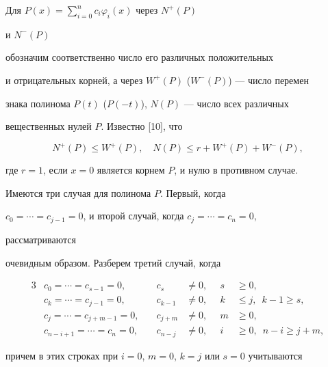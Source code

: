 \begin{pf} Для $P(x)=\sum\limits^n_{i=0}c_i\varphi_i(x)$ через $N^+(P)$ 


и $N^-(P)$ 


обозначим соответственно число его различных положительных 


и отрицательных корней, а через $W^+(P)$ ($W^-(P)$) --- число перемен 


знака полинома $P(t)$ ($P(-t)$), $N(P)$ --- число всех различных 


вещественных нулей $P$. Известно [10], что 


\begin{equation} 


N^+(P)\le W^+(P),\quad N(P)\le r+W^+(P)+W^-(P), 


\end{equation} 


где $r=1$, если $x=0$ является корнем $P$, и нулю в противном случае. 


 


Имеются три случая для полинома $P$. Первый, когда 


$c_0=\dotsb=c_{j-1}=0$, и второй случай, когда $c_j=\dotsb=c_n=0$, 


рассматриваются 


очевидным образом. Разберем третий случай, когда 


\begin{alignat*}{3} 


&c_0=\dotsb=c_{s-1}=0, &\quad 


c_s&\ne 0, &\ \; s&\ge 0,\\ 


%


&c_k=\dotsb=c_{j-1}=0, &\quad 


c_{k-1}&\ne 0, &\ \; k&\le j,\ \; k-1\ge s,\\ 


%


&c_j=\dotsb=c_{j+m-1}=0, &\quad  


c_{j+m}&\ne 0, &\ \; m&\ge 0, \\ 


%


&c_{n-i+1}=\dotsb=c_n=0, &\quad 


c_{n-j}&\ne 0, &\ \; i&\ge 0,\ \; n-i\ge j+m, 


\end{alignat*} 


причем в этих строках при $i=0$, $m=0$, $k=j$ или $s=0$ учитываются 



\end{pf}
